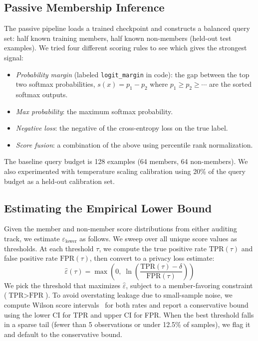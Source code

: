 \documentclass{article}
\begin{document}
\subsection{Passive Membership Inference}

The passive pipeline loads a trained checkpoint and constructs a balanced query set: half known training members, half known non-members (held-out test examples). We tried four different scoring rules to see which gives the strongest signal:

\begin{itemize}
    \item \emph{Probability margin} (labeled \texttt{logit\_margin} in code): the gap between the top two softmax probabilities, $s(x) = p_1 - p_2$ where $p_1 \geq p_2 \geq \cdots$ are the sorted softmax outputs.
    \item \emph{Max probability}: the maximum softmax probability.
    \item \emph{Negative loss}: the negative of the cross-entropy loss on the true label.
    \item \emph{Score fusion}: a combination of the above using percentile rank normalization.
\end{itemize}

The baseline query budget is 128 examples (64 members, 64 non-members). We also experimented with temperature scaling calibration using 20\% of the query budget as a held-out calibration set.

\subsection{Estimating the Empirical Lower Bound}

Given the member and non-member score distributions from either auditing track, we estimate $\varepsilon_{\text{lower}}$ as follows. We sweep over all unique score values as thresholds. At each threshold $\tau$, we compute the true positive rate $\text{TPR}(\tau)$ and false positive rate $\text{FPR}(\tau)$, then convert to a privacy loss estimate:
\begin{equation}
    \hat{\varepsilon}(\tau) = \max\!\left(0, \;\ln\!\left(\frac{\text{TPR}(\tau) - \delta}{\text{FPR}(\tau)}\right)\right)
\end{equation}
We pick the threshold that maximizes $\hat{\varepsilon}$, subject to a member-favoring constraint ($\text{TPR} > \text{FPR}$). To avoid overstating leakage due to small-sample noise, we compute Wilson score intervals~\citep{wilson1927probable} for both rates and report a conservative bound using the lower CI for TPR and upper CI for FPR. When the best threshold falls in a sparse tail (fewer than 5 observations or under 12.5\% of samples), we flag it and default to the conservative bound.
\end{document}
